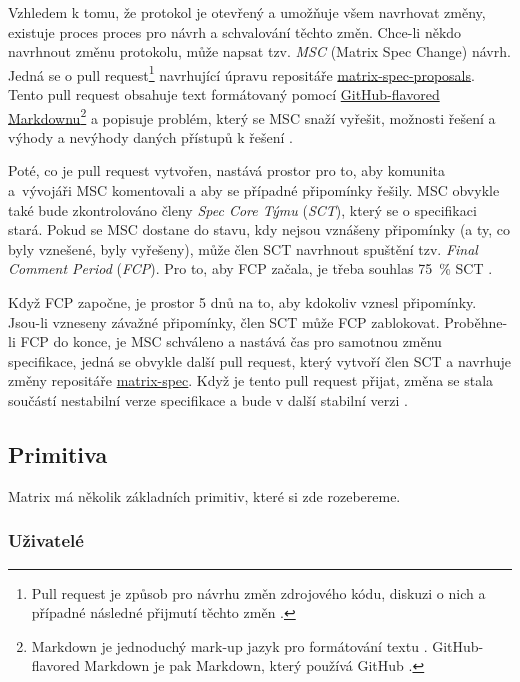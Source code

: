 Vzhledem k tomu, že protokol je otevřený a umožňuje všem navrhovat změny,
existuje proces proces pro návrh a schvalování těchto změn. Chce-li někdo
navrhnout změnu protokolu, může napsat tzv. \textit{MSC} (Matrix Spec Change)
návrh. Jedná se o pull request\footnote{
	Pull request je způsob pro návrhu změn
	zdrojového kódu, diskuzi o nich a případné následné přijmutí těchto změn
	\cite{GitHub-PullRequests}.
}
navrhující úpravu repositáře
\href{https://github.com/matrix-org/matrix-spec-proposals}{matrix-spec-proposals}.
Tento pull request obsahuje text formátovaný pomocí
\href{https://docs.github.com/en/get-started/writing-on-github/getting-started-with-writing-and-formatting-on-github/basic-writing-and-formatting-syntax}{GitHub-flavored Markdownu}\footnote{
	Markdown je jednoduchý mark-up jazyk pro formátování textu
	\cite{JohnGruber-Markdown}. GitHub-flavored Markdown je pak Markdown, který
	používá GitHub \cite{GitHub-Markdown}.
} a popisuje problém, který se MSC snaží vyřešit, možnosti řešení a výhody a
nevýhody daných přístupů k řešení \cite{MatrixORG-MSCs}.

Poté, co je pull request vytvořen, nastává prostor pro to, aby komunita
a~vývojáři MSC komentovali a aby se případné připomínky řešily. MSC obvykle také
bude zkontrolováno členy \textit{Spec Core Týmu} (\textit{SCT}), který se o
specifikaci stará. Pokud se MSC dostane do stavu, kdy nejsou vznášeny připomínky
(a ty, co byly vznešené, byly vyřešeny), může člen SCT navrhnout spuštění tzv.
\textit{Final Comment Period} (\textit{FCP}). Pro to, aby FCP začala, je třeba
souhlas 75~\% SCT \cite{MatrixORG-MSCs}.

Když FCP započne, je prostor 5 dnů na to, aby kdokoliv vznesl připomínky.
Jsou-li vzneseny závažné připomínky, člen SCT může FCP zablokovat. Proběhne-li
FCP do konce, je MSC schváleno a nastává čas pro samotnou změnu specifikace,
jedná se obvykle další pull request, který vytvoří člen SCT a navrhuje změny
repositáře \href{https://github.com/matrix-org/matrix-spec}{matrix-spec}. Když
je tento pull request přijat, změna se stala součástí nestabilní verze
specifikace a bude v další stabilní verzi \cite{MatrixORG-MSCs}.

\subsection{Primitiva}

Matrix má několik základních primitiv, které si zde rozebereme.

\subsubsection{Uživatelé}

